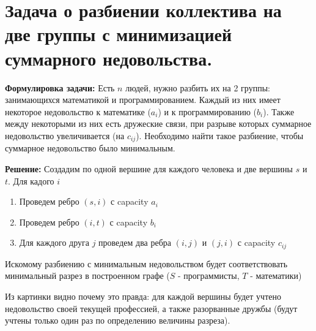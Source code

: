 \section{Задача о разбиении коллектива на две группы с минимизацией суммарного недовольства.}
\par \textbf{Формулировка задачи:} Есть $n$ людей, нужно разбить их на 2 группы: занимающихся математикой и программированием. Каждый из них имеет некоторое недовольство к математике ($a_i$) и к программированию ($b_i$). Также между некоторыми из них есть дружеские связи, при разрыве которых суммарное недовольство увеличивается (на $c_{ij}$). Необходимо найти такое разбиение, чтобы суммарное недовольство было минимальным.
\par \textbf{Решение:} Создадим по одной вершине для каждого человека и две вершины $s$ и $t$. Для кадого $i$ \begin{enumerate}
    \item Проведем ребро $(s,i)$ с capacity $a_i$
    \item Проведем ребро $(i,t)$ с capacity $b_i$
    \item Для каждого друга $j$ проведем два ребра $(i,j)$ и $(j, i)$ с capacity $c_{ij}$
\end{enumerate}
\par Искомому разбиению с минимальным недовольством будет соответствовать минимальный разрез в построенном графе ($S$ - программисты, $T$ - математики)
\begin{figure}[h]
\end{figure}
\par Из картинки видно почему это правда: для каждой вершины будет учтено недовольство своей текущей профессией, а также разорванные дружбы (будут учтены только один раз по определению величины разреза).
\\


